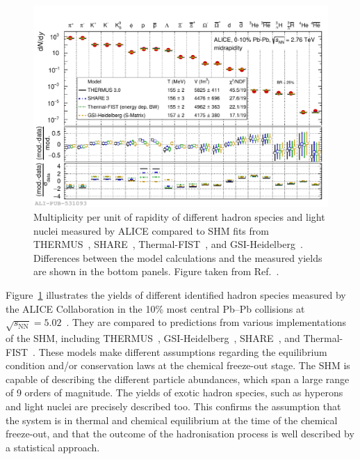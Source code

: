 \begin{figure}[htb]
  \centering
  \includegraphics[width=\linewidth]{Figures/Chapter 1/SHM_fit_PbPb010_arp_all.pdf}
  \caption{Multiplicity per unit of rapidity of different hadron species and light nuclei measured by ALICE compared to SHM fits from THERMUS~\cite{Wheaton:2004qb}, SHARE~\cite{Torrieri:2004zz}, Thermal-FIST~\cite{Vovchenko:2019pjl}, and GSI-Heidelberg~\cite{Andronic:2005yp}. Differences between the model calculations and the measured yields are shown in the bottom panels. Figure taken from Ref.~\cite{ALICE:2022wpn}.}
  \label{fig:SHM_fit}
\end{figure}

\begin{sloppypar}
Figure~\ref{fig:SHM_fit} illustrates the yields of different identified hadron species measured by the ALICE Collaboration in the 10\% most central Pb--Pb collisions at \mbox{$\sqrt{s_\mathrm{NN}} = 5.02$~\tev}. They are compared to predictions from various implementations of the SHM, including THERMUS~\cite{Wheaton:2004qb}, GSI-Heidelberg~\cite{Andronic:2005yp}, SHARE~\cite{Torrieri:2004zz}, and Thermal-FIST~\cite{Vovchenko:2019pjl}. These models make different assumptions regarding the equilibrium condition and/or conservation laws at the chemical freeze-out stage. The SHM is capable of describing the different particle abundances, which span a large range of 9 orders of magnitude. The yields of exotic hadron species, such as hyperons and light nuclei are precisely described too. This confirms the assumption that the system is in thermal and chemical equilibrium at the time of the chemical freeze-out, and that the outcome of the hadronisation process is well described by a statistical approach.
\end{sloppypar}

